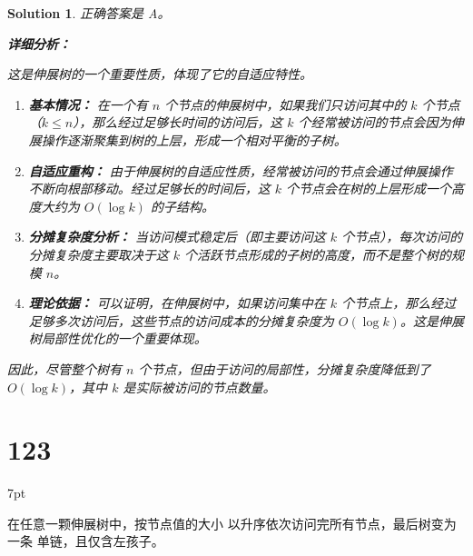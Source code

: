 \documentclass[UTF8]{report}
\newtheorem{solution}{Solution}
\theoremstyle{MyLineTheoremStyle} %
\theoremstyle{MyBlockTheoremStyle} %
\theoremstyle{MySubsubsectionStyle} %
\newenvironment{graybox}{%
        \def\FrameCommand{%
        \hspace{1pt}%
        {\color{gray}\small \vrule width 2pt}%
        {\color{graybox_color}\vrule width 4pt}%
        \colorbox{graybox_color}%
        }%
        \MakeFramed{\advance\hsize-\width\FrameRestore}%
        \noindent\hspace{-4.55pt}%
        \begin{adjustwidth}{}{7pt}%
        \vspace{2pt}\vspace{2pt}%
        }
        {%
        \vspace{2pt}\end{adjustwidth}\endMakeFramed%
        }
\begin{document}
\begin{solution}
正确答案是 A。

\textbf{详细分析：}

这是伸展树的一个重要性质，体现了它的自适应特性。

\begin{enumerate}
    \item \textbf{基本情况：}
    在一个有 $n$ 个节点的伸展树中，如果我们只访问其中的 $k$ 个节点（$k \leq n$），那么经过足够长时间的访问后，这 $k$ 个经常被访问的节点会因为伸展操作逐渐聚集到树的上层，形成一个相对平衡的子树。

    \item \textbf{自适应重构：}
    由于伸展树的自适应性质，经常被访问的节点会通过伸展操作不断向根部移动。经过足够长的时间后，这 $k$ 个节点会在树的上层形成一个高度大约为 $O(\log k)$ 的子结构。

    \item \textbf{分摊复杂度分析：}
    当访问模式稳定后（即主要访问这 $k$ 个节点），每次访问的分摊复杂度主要取决于这 $k$ 个活跃节点形成的子树的高度，而不是整个树的规模 $n$。

    \item \textbf{理论依据：}
    可以证明，在伸展树中，如果访问集中在 $k$ 个节点上，那么经过足够多次访问后，这些节点的访问成本的分摊复杂度为 $O(\log k)$。这是伸展树局部性优化的一个重要体现。
\end{enumerate}

因此，尽管整个树有 $n$ 个节点，但由于访问的局部性，分摊复杂度降低到了 $O(\log k)$，其中 $k$ 是实际被访问的节点数量。
\end{solution}


\section*{123}
\begin{graybox}
在任意一颗伸展树中，按节点值的大小
以升序依次访问完所有节点，最后树变为一条
单链，且仅含左孩子。
\end{graybox}
\end{document}
